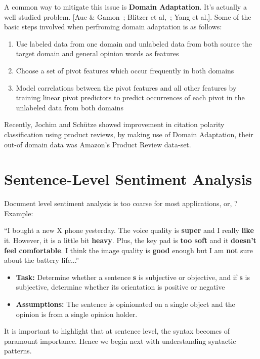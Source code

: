 A common way to mitigate this issue is \textbf{Domain Adaptation}. It's actually a well studied problem. [Aue \& Gamon~\parencite{ch2:auegamon}; Blitzer et al,~\parencite{BlitzerPaper:2007}; Yang et al,\parencite{ch2:yang}]. Some of the basic steps involved when perfroming domain adaptation is as follows:
\begin{enumerate}
\item Use labeled data from one domain and unlabeled data from both source the target domain and general opinion words as features
\item Choose a set of pivot features which occur frequently in both domains
\item Model correlations between the pivot features and all other features by training linear pivot predictors to predict occurrences of each pivot in the unlabeled data from both domains
\end{enumerate}
Recently, Jochim and Sch{\"u}tze \parencite{ch2:jochim} showed improvement in citation polarity classification using product reviews, by making use of Domain Adaptation, their out-of domain data was Amazon's Product Review data-set.

\section{Sentence-Level Sentiment Analysis}
Document level sentiment analysis is too coarse for most applications,\Smiley{} or, \Frowny{}? Example:
\newline

“I bought a new X phone yesterday. The voice quality is \textbf{super} and I really \textbf{like} it. However, it is a little bit \textbf{heavy}. Plus, the key pad is \textbf{too soft} and it \textbf{doesn’t feel comfortable}. I think the image quality is \textbf{good} enough but I am \textbf{not} sure about the battery life...”
\begin{itemize}
\item \textbf{Task:} Determine whether a sentence \textbf{s} is subjective or objective, and if \textbf{s} is subjective, determine whether its orientation is positive or negative
\item \textbf{Assumptions:} The sentence is opinionated on a single object and the opinion is from a single opinion holder.
\end{itemize}

It is important to highlight that at sentence level, the syntax becomes of paramount importance. Hence we begin next with understanding syntactic patterns.

